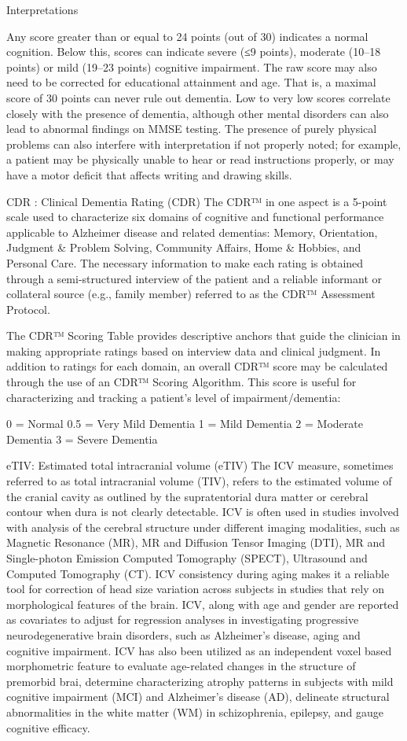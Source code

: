 \documentclass[
]{article}
\begin{document}
Interpretations

Any score greater than or equal to 24 points (out of 30) indicates a
normal cognition. Below this, scores can indicate severe (≤9 points),
moderate (10--18 points) or mild (19--23 points) cognitive impairment.
The raw score may also need to be corrected for educational attainment
and age. That is, a maximal score of 30 points can never rule out
dementia. Low to very low scores correlate closely with the presence of
dementia, although other mental disorders can also lead to abnormal
findings on MMSE testing. The presence of purely physical problems can
also interfere with interpretation if not properly noted; for example, a
patient may be physically unable to hear or read instructions properly,
or may have a motor deficit that affects writing and drawing skills.

CDR : Clinical Dementia Rating (CDR) The CDR™ in one aspect is a 5-point
scale used to characterize six domains of cognitive and functional
performance applicable to Alzheimer disease and related dementias:
Memory, Orientation, Judgment \& Problem Solving, Community Affairs,
Home \& Hobbies, and Personal Care. The necessary information to make
each rating is obtained through a semi-structured interview of the
patient and a reliable informant or collateral source (e.g., family
member) referred to as the CDR™ Assessment Protocol.

The CDR™ Scoring Table provides descriptive anchors that guide the
clinician in making appropriate ratings based on interview data and
clinical judgment. In addition to ratings for each domain, an overall
CDR™ score may be calculated through the use of an CDR™ Scoring
Algorithm. This score is useful for characterizing and tracking a
patient's level of impairment/dementia:

0 = Normal 0.5 = Very Mild Dementia 1 = Mild Dementia 2 = Moderate
Dementia 3 = Severe Dementia

eTIV: Estimated total intracranial volume (eTIV) The ICV measure,
sometimes referred to as total intracranial volume (TIV), refers to the
estimated volume of the cranial cavity as outlined by the supratentorial
dura matter or cerebral contour when dura is not clearly detectable. ICV
is often used in studies involved with analysis of the cerebral
structure under different imaging modalities, such as Magnetic Resonance
(MR), MR and Diffusion Tensor Imaging (DTI), MR and Single-photon
Emission Computed Tomography (SPECT), Ultrasound and Computed Tomography
(CT). ICV consistency during aging makes it a reliable tool for
correction of head size variation across subjects in studies that rely
on morphological features of the brain. ICV, along with age and gender
are reported as covariates to adjust for regression analyses in
investigating progressive neurodegenerative brain disorders, such as
Alzheimer's disease, aging and cognitive impairment. ICV has also been
utilized as an independent voxel based morphometric feature to evaluate
age-related changes in the structure of premorbid brai, determine
characterizing atrophy patterns in subjects with mild cognitive
impairment (MCI) and Alzheimer's disease (AD), delineate structural
abnormalities in the white matter (WM) in schizophrenia, epilepsy, and
gauge cognitive efficacy.
\end{document}
